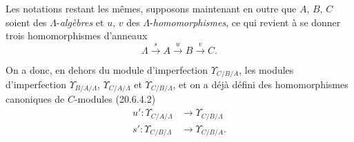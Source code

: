 \begin{env}[20.6.14]
\label{0.20.6.14-fr}
Les notations restant les mêmes, supposons maintenant en outre que $A$,
$B$, $C$ soient des $\Lambda$-\emph{algèbres} et $u$, $v$ des
$\Lambda$-\emph{homomorphismes}, ce qui revient à se donner trois homomorphismes
d'anneaux
\[
  \Lambda\xrightarrow{s}A\xrightarrow{u}B\xrightarrow{v}C.
\]

On a donc, en dehors du module d'imperfection $\Upsilon_{C/B/A}$, les
modules d'imperfection $\Upsilon_{B/A/\Lambda}$,
$\Upsilon_{C/A/\Lambda}$ et $\Upsilon_{C/B/\Lambda}$, et on a déjà défini
des homomorphismes canoniques de $C$-modules (20.6.4.2)
\begin{align}
\tag{20.6.14.1}
\label{0.20.6.14.1-fr}
  u':\Upsilon_{C/A/\Lambda}&\longrightarrow\Upsilon_{C/B/\Lambda}\\
\tag{20.6.14.2}
\label{0.20.6.14.2-fr}
  s':\Upsilon_{C/B/\Lambda}&\longrightarrow\Upsilon_{C/B/A}.
\end{align}


\end{env}

